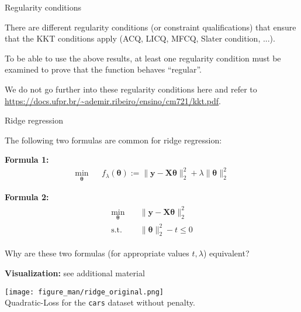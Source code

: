 \documentclass[11pt,compress,t,notes=noshow, xcolor=table]{beamer}
\begin{document}
\begin{vbframe}{Regularity conditions}

There are different regularity conditions (or constraint qualifications) that ensure that the KKT conditions apply (ACQ, LICQ, MFCQ, Slater condition, ...).

\lz

To be able to use the above results, at least one regularity condition must be examined to prove that the function behaves \enquote{regular}.

\lz

We do not go further into these regularity conditions here and refer to \url{https://docs.ufpr.br/~ademir.ribeiro/ensino/cm721/kkt.pdf}.

\end{vbframe}

\begin{vbframe}{Ridge regression}

The following two formulas are common for ridge regression:

\lz
\textbf{Formula 1:}
\begin{eqnarray}
  \min_{\bm{\theta}} && f_\lambda(\bm{\theta}) := \|\bm{y} - \mathbf{X}\bm{\theta}\|_2^2 + \lambda \|\bm{\theta}\|_2^2
\label{eq:form1}
\end{eqnarray}

\vspace*{-0.2cm}
\textbf{Formula 2:}
\begin{align}
\begin{split}
\min_{\bm{\theta}} & \quad \|\bm{y} - \mathbf{X}\bm{\theta}\|_2^2 \\
\text{s.t. } & \quad \|\bm{\theta}\|_2^2 - t \le 0
\end{split}
\label{eq:form2}
\end{align}



Why are these two formulas (for appropriate values $t, \lambda$) equivalent?

\framebreak

\textbf{Visualization:} see additional material

\lz

\begin{center}
\texttt{[image: figure\_man/ridge\_original.png]} \\
Quadratic-Loss for the \texttt{cars} dataset without penalty.
\end{center}

\lz


\end{vbframe}
\end{document}

